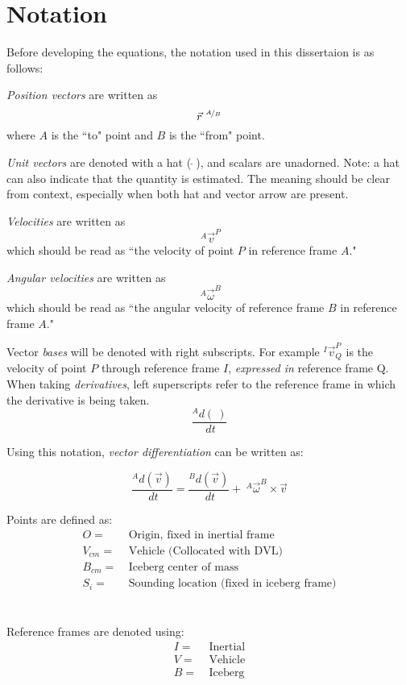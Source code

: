 \section{Notation}

Before developing the equations, the notation used in this dissertaion is as follows:

\emph{Position vectors} are written as
\begin{equation*}
 \vec{r}^{~\nicefrac{A}{B}} 
\end{equation*}
where $A$ is the ``to" point and $B$ is the ``from" point.

\emph{Unit vectors} are denoted with a hat ($~\hat{}~$), and scalars are unadorned. Note: a hat can also indicate that the quantity is estimated. The meaning should be clear from context, especially when both hat and vector arrow are present.

\emph{Velocities} are written as 
\begin{equation*} 
~^{A}\vec{v}^{P} 
\end{equation*}
which should be read as ``the velocity of point $P$ in reference frame $A$."

\emph{Angular velocities} are written as 
\begin{equation*}
 ~^{A}\vec{\omega}^{B}
\end{equation*}
which should be read as ``the angular velocity of reference frame $B$ in reference frame $A$."

Vector \emph{bases} will be denoted with right subscripts. For example $^I\vec{v}^P_{Q}$ is the velocity of point $P$ through reference frame $I$, \emph{expressed in} reference frame Q.   
When taking \emph{derivatives}, left superscripts refer to the reference frame in which the derivative is being taken.
\begin{equation*}
 \frac{^{A}d(~)}{~dt}
\end{equation*}

Using this notation, \emph{vector differentiation} can be written as:

\begin{equation*}
 \frac{^{A}d(\vec{v})}{~dt} = \frac{^{B}d(\vec{v})}{~dt} + ~^{A}\vec{\omega}^{B}\times \vec{v}
\end{equation*}

Points are defined as:
\begin{align*}
O =&~ \text{Origin, fixed in inertial frame}\\
V_{cm} =&~ \text{Vehicle (Collocated with DVL)} \\
B_{cm} =&~ \text{Iceberg center of mass}\\
S_i =&~ \text{Sounding location (fixed in iceberg frame)}
\end{align*}
\\
\\
Reference frames are denoted using:
\begin{align*}
I =&~ \text{Inertial}\\
V =&~ \text{Vehicle} \\
B =&~ \text{Iceberg}
\end{align*}

